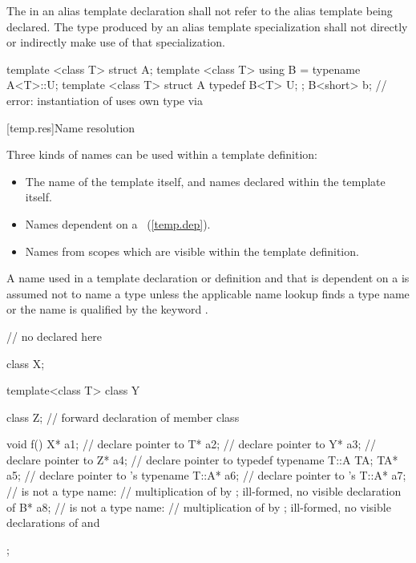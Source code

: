 \pnum
The  in an alias template declaration shall not refer to
the alias template being declared. The type produced by an alias template
specialization shall not directly or indirectly make use of that specialization.
\begin{example}

\begin{codeblock}
template <class T> struct A;
template <class T> using B = typename A<T>::U;
template <class T> struct A {
  typedef B<T> U;
};
B<short> b;         // error: instantiation of  uses own type via 
\end{codeblock}
\end{example}

[temp.res]{Name resolution}

\pnum
{}%
%
Three kinds of names can be used within a template definition:

\begin{itemize}
\item
The name of the template itself,
and names declared within the template itself.
\item
Names dependent on a
~(\ref{temp.dep}).
\item
Names from scopes which are visible within the template definition.
\end{itemize}

\pnum
A name used in a template declaration or definition and that is
dependent on a
is assumed not to name a type unless
the applicable name lookup finds a type name or the name
is qualified by the keyword
.
\begin{example}

\begin{codeblock}
// no  declared here

class X;

template<class T> class Y {
  class Z;                      // forward declaration of member class

  void f() {
    X* a1;                      // declare pointer to 
    T* a2;                      // declare pointer to 
    Y* a3;                      // declare pointer to 
    Z* a4;                      // declare pointer to 
    typedef typename T::A TA;
    TA* a5;                     // declare pointer to 's 
    typename T::A* a6;          // declare pointer to 's 
    T::A* a7;                   //  is not a type name:
                                // multiplication of  by ; ill-formed, no visible declaration of 
    B* a8;                      //  is not a type name:
                                // multiplication of  by ; ill-formed, no visible declarations of  and 
  }
};
\end{codeblock}
\end{example}

